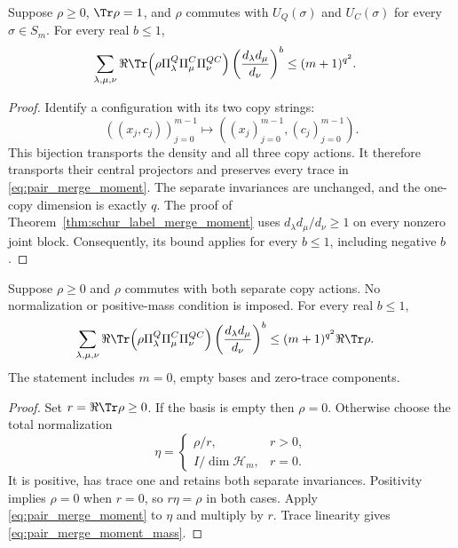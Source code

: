 \begin{theorem}
\label{thm:pair_merge_moment}
\leanok
{}
Suppose $\rho\ge0$, $\Tr\rho=1$, and $\rho$ commutes with
$U_Q(\sigma)$ and $U_C(\sigma)$ for every $\sigma\in S_m$.
For every real $b\le1$,
\begin{align}
 \sum_{\lambda,\mu,\nu}
  \Re\Tr\!\left(\rho\Pi^Q_\lambda\Pi^C_\mu\Pi^{QC}_\nu\right)
  \left(\frac{d_\lambda d_\mu}{d_\nu}\right)^b
  &\le(m+1)^{q^2}.
 \label{eq:pair_merge_moment}
\end{align}
\end{theorem}
\begin{proof}
\leanok
{}
Identify a configuration with its two copy strings:
\[
 ((x_j,c_j))_{j=0}^{m-1}
   \longmapsto ((x_j)_{j=0}^{m-1},(c_j)_{j=0}^{m-1}).
\]
This bijection transports the density and all three copy actions. It
therefore transports their central projectors and preserves every trace
in \eqref{eq:pair_merge_moment}. The separate invariances are unchanged,
and the one-copy dimension is exactly $q$. The proof of
Theorem~\ref{thm:schur_label_merge_moment} uses
$d_\lambda d_\mu/d_\nu\ge1$ on every nonzero joint block. Consequently,
its bound applies for every $b\le1$, including negative $b$.
\end{proof}

\begin{theorem}
\label{thm:pair_merge_moment_mass}
\leanok
{}
Suppose $\rho\ge0$ and $\rho$ commutes with both separate copy actions.
No normalization or positive-mass condition is imposed. For every real
$b\le1$,
\begin{align}
 \sum_{\lambda,\mu,\nu}
  \Re\Tr\!\left(\rho\Pi^Q_\lambda\Pi^C_\mu\Pi^{QC}_\nu\right)
  \left(\frac{d_\lambda d_\mu}{d_\nu}\right)^b
  &\le(m+1)^{q^2}\Re\Tr\rho.
 \label{eq:pair_merge_moment_mass}
\end{align}
The statement includes $m=0$, empty bases and zero-trace components.
\end{theorem}
\begin{proof}
\leanok
{}
Set $r=\Re\Tr\rho\ge0$. If the basis is empty then $\rho=0$.
Otherwise choose the total normalization
\[
 \eta=\begin{cases}
   \rho/r,&r>0,\\
   I/\dim\mathcal H_m,&r=0.
 \end{cases}
\]
It is positive, has trace one and retains both separate invariances.
Positivity implies $\rho=0$ when $r=0$, so $r\eta=\rho$ in both cases.
Apply \eqref{eq:pair_merge_moment} to $\eta$ and multiply by $r$.
Trace linearity gives \eqref{eq:pair_merge_moment_mass}.
\end{proof}
